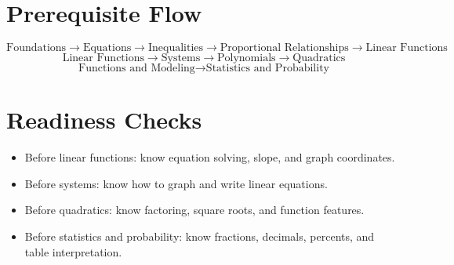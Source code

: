 \documentclass[11pt]{article}
\begin{document}
\section*{Prerequisite Flow}
\[
\text{Foundations}\rightarrow \text{Equations}\rightarrow \text{Inequalities}\rightarrow \text{Proportional Relationships}\rightarrow \text{Linear Functions}
\]
\[
\text{Linear Functions}\rightarrow \text{Systems}\rightarrow \text{Polynomials}\rightarrow \text{Quadratics}
\]
\[
\text{Functions and Modeling}\rightarrow \text{Statistics and Probability}
\]

\section*{Readiness Checks}
\begin{itemize}
  \item Before linear functions: know equation solving, slope, and graph coordinates.
  \item Before systems: know how to graph and write linear equations.
  \item Before quadratics: know factoring, square roots, and function features.
  \item Before statistics and probability: know fractions, decimals, percents, and table interpretation.
\end{itemize}
\end{document}
